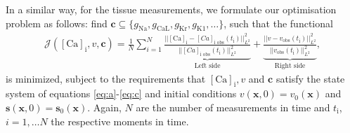 \documentclass{article}
\begin{document}
In a similar way, for the tissue measurements, we formulate our optimisation problem as follows: find $\boldsymbol{c} \subseteq\{ g_{\mathrm{Na}}, g_{\mathrm{CaL}}, g_{\mathrm{Kr}}, g_{\mathrm{K1}}, \ldots \}$, such that the functional
\begin{eqnarray} 
\mathcal{J}([\mathrm{Ca}]_{\mathrm{i}}, v, \boldsymbol{c}) = \frac{1}{N} \sum_{i=1}^{N} \underbrace{\frac{||[\mathrm{Ca}]_{\mathrm{i}}-[Ca]_{\text{i obs}}(t_{\mathrm{i}}) ||^2_{L^2}}{||[Ca]_{\text{i obs}}(t_{\mathrm{i}}) ||^2_{L^2}}}_{\text{Left side}} +  \underbrace{\frac{||v-v_{\text{obs}}(t_{\mathrm{i}})||^2_{L^2}}{||v_{\text{obs}}(t_{\mathrm{i}})||^2_{L^2}}}_{\text{Right side}},\label{J}
\end{eqnarray}
is minimized, subject to the requirements that $[\mathrm{Ca}]_{\mathrm{i}}, v$ and $\boldsymbol{c}$ satisfy the state system of equations \eqref{eq:a}-\eqref{eq:c} and initial conditions $v(\textbf{x},0)=v_0(\textbf{x})$ and $\mathbf{s}(\mathbf{x},0)=\mathbf{s}_0(\mathbf{x})$. Again, $N$ are the number of measurements in time and $t_{\mathrm{i}}$, $i=1, \dots N$ the respective moments in time. 
%
\end{document}
